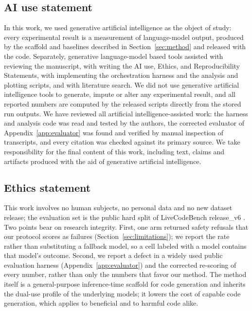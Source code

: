 \documentclass{article}
\begin{document}
\subsection*{AI use statement}

In this work, we used generative artificial intelligence as the object of study: every experimental result is a
measurement of language-model output, produced by the scaffold and baselines described in
Section~\ref{sec:method} and released with the code. Separately, generative language-model based tools assisted
with reviewing the manuscript, with writing the AI use, Ethics, and Reproducibility Statements, with implementing the orchestration harness and the
analysis and plotting scripts, and with literature search. We did not use generative artificial intelligence tools to
generate, impute or alter any experimental result, and all reported numbers are computed by the
released scripts directly from the stored run outputs. We have reviewed all artificial intelligence-assisted work: the
harness and analysis code was read and tested by the authors, the corrected evaluator of
Appendix~\ref{app:evaluator} was found and verified by manual inspection of transcripts, and every
citation was checked against its primary source. We take responsibility for the final content of
this work, including text, claims and artifacts produced with the aid of generative artificial intelligence.

\subsection*{Ethics statement}

This work involves no human subjects, no personal data and no new dataset release; the evaluation
set is the public hard split of LiveCodeBench release\_v6 \citep{jain2024}. Two points bear
on research integrity. First, one arm returned safety refusals that our protocol scores as
failures (Section~\ref{sec:limitations}); we report the rate rather than substituting a fallback
model, so a cell labeled with a model contains that model's outcome. Second, we report a defect in
a widely used public evaluation harness (Appendix~\ref{app:evaluator}) and the corrected
re-scoring of every number, rather than only the numbers that favor our method. The method itself
is a general-purpose inference-time scaffold for code generation and inherits the dual-use profile
of the underlying models; it lowers the cost of capable code generation, which applies to
beneficial and to harmful code alike.
\end{document}
